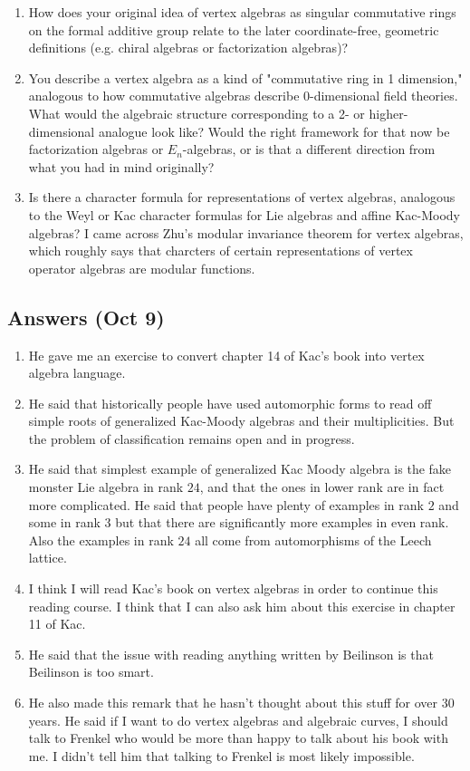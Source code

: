 \documentclass[12pt]{article}
\begin{document}
\begin{enumerate}
    \item How does your original idea of vertex algebras as singular commutative rings on the formal additive group relate to the later coordinate-free, geometric definitions (e.g. chiral algebras or factorization algebras)?


    \item You describe a vertex algebra as a kind of "commutative ring in 1 dimension," analogous to how commutative algebras describe 0-dimensional field theories. What would the algebraic structure corresponding to a 2- or higher-dimensional analogue look like? Would the right framework for that now be factorization algebras or $E_n$-algebras, or is that a different direction from what you had in mind originally?


    \item Is there a character formula for representations of vertex algebras, analogous to the Weyl or Kac character formulas for Lie algebras and affine Kac-Moody algebras? I came across Zhu's modular invariance theorem for vertex algebras, which roughly says that charcters of certain representations of vertex operator algebras are modular functions.
\end{enumerate}

\subsection*{Answers (Oct 9)}
\begin{enumerate}
    \item He gave me an exercise to convert chapter 14 of Kac's book into vertex algebra language.
    \item He said that historically people have used automorphic forms to read off simple roots of generalized Kac-Moody algebras and their multiplicities. But the problem of classification remains open and in progress.
    \item He said that simplest example of generalized Kac Moody algebra is the fake monster Lie algebra in rank $24$, and that the ones in lower rank are in fact more complicated. He said that people have plenty of examples in rank $2$ and some in rank $3$ but that there are significantly more examples in even rank. Also the examples in rank $24$ all come from automorphisms of the Leech lattice.
    \item I think I will read Kac's book on vertex algebras in order to continue this reading course. I think that I can also ask him about this exercise in chapter 11 of Kac.
    \item He said that the issue with reading anything written by Beilinson is that Beilinson is too smart.
    \item He also made this remark that he hasn't thought about this stuff for over 30 years. He said if I want to do vertex algebras and algebraic curves, I should talk to Frenkel who would be more than happy to talk about his book with me. I didn't tell him that talking to Frenkel is most likely impossible.
\end{enumerate}
\end{document}
